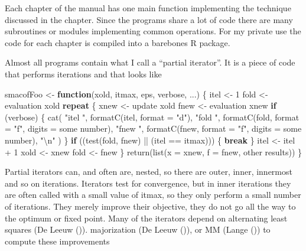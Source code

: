 \documentclass[
  12pt,
  letterpaper,
  DIV=11,
  numbers=noendperiod]{scrartcl}
\newenvironment{Shaded}{\begin{snugshade}}{\end{snugshade}}
\newcommand{\AttributeTok}[1]{\textcolor[rgb]{0.40,0.45,0.13}{#1}}
\newcommand{\ControlFlowTok}[1]{\textcolor[rgb]{0.00,0.23,0.31}{\textbf{#1}}}
\newcommand{\DecValTok}[1]{\textcolor[rgb]{0.68,0.00,0.00}{#1}}
\newcommand{\FunctionTok}[1]{\textcolor[rgb]{0.28,0.35,0.67}{#1}}
\newcommand{\NormalTok}[1]{\textcolor[rgb]{0.00,0.23,0.31}{#1}}
\newcommand{\OtherTok}[1]{\textcolor[rgb]{0.00,0.23,0.31}{#1}}
\newcommand{\SpecialCharTok}[1]{\textcolor[rgb]{0.37,0.37,0.37}{#1}}
\newcommand{\StringTok}[1]{\textcolor[rgb]{0.13,0.47,0.30}{#1}}
\theoremstyle{plain}
\theoremstyle{remark}
\begin{document}
Each chapter of the manual has one main function implementing the
technique discussed in the chapter. Since the programs share a lot of
code there are many subroutines or modules implementing common
operations. For my private use the code for each chapter is compiled
into a barebones R package.

Almost all programs contain what I call a ``partial iterator''. It is a
piece of code that performs iterations and that looks like

\begin{Shaded}
\begin{Highlighting}[]
\NormalTok{smacofFoo }\OtherTok{\textless{}{-}} \ControlFlowTok{function}\NormalTok{(xold, itmax, eps, verbose, ...) \{}
\NormalTok{  itel }\OtherTok{\textless{}{-}} \DecValTok{1}
\NormalTok{  fold }\OtherTok{\textless{}{-}}\NormalTok{ evaluation xold}
  \ControlFlowTok{repeat}\NormalTok{ \{}
\NormalTok{    xnew }\OtherTok{\textless{}{-}}\NormalTok{ update xold}
\NormalTok{    fnew }\OtherTok{\textless{}{-}}\NormalTok{ evaluation xnew}
    \ControlFlowTok{if}\NormalTok{ (verbose) \{}
      \FunctionTok{cat}\NormalTok{(}
        \StringTok{"itel "}\NormalTok{,}
        \FunctionTok{formatC}\NormalTok{(itel, }\AttributeTok{format =} \StringTok{"d"}\NormalTok{),}
        \StringTok{"fold "}\NormalTok{,}
        \FunctionTok{formatC}\NormalTok{(fold, }\AttributeTok{format =} \StringTok{"f"}\NormalTok{, }\AttributeTok{digits =}\NormalTok{ some number),}
        \StringTok{"fnew "}\NormalTok{,}
        \FunctionTok{formatC}\NormalTok{(fnew, }\AttributeTok{format =} \StringTok{"f"}\NormalTok{, }\AttributeTok{digits =}\NormalTok{ some number),}
        \StringTok{"}\SpecialCharTok{\textbackslash{}n}\StringTok{"}
\NormalTok{      )}
\NormalTok{    \}}
    \ControlFlowTok{if}\NormalTok{ ((}\FunctionTok{test}\NormalTok{(fold, fnew) }\SpecialCharTok{||}\NormalTok{ (itel }\SpecialCharTok{==}\NormalTok{ itmax))) \{}
      \ControlFlowTok{break}
\NormalTok{    \}}
\NormalTok{    itel }\OtherTok{\textless{}{-}}\NormalTok{ itel }\SpecialCharTok{+} \DecValTok{1}
\NormalTok{    xold }\OtherTok{\textless{}{-}}\NormalTok{ xnew}
\NormalTok{    fold }\OtherTok{\textless{}{-}}\NormalTok{ fnew}
\NormalTok{  \}}
  \FunctionTok{return}\NormalTok{(}\FunctionTok{list}\NormalTok{(}\AttributeTok{x =}\NormalTok{ xnew, }\AttributeTok{f =}\NormalTok{ fnew, other results))}
\NormalTok{\}}
\end{Highlighting}
\end{Shaded}

Partial iterators can, and often are, nested, so there are outer, inner,
innermost and so on iterations. Iterators test for convergence, but in
inner iterations they are often called with a small value of itmax, so
they only perform a small number of iterations. They merely improve
their objective, they do not go all the way to the optimum or fixed
point. Many of the iterators depend on alternating least squares (De
Leeuw ()). majorization (De Leeuw
()), or MM (Lange
()) to compute these improvements
\end{document}
